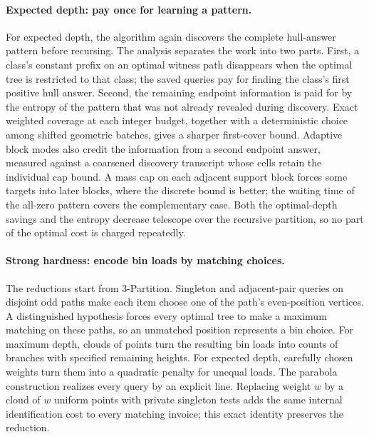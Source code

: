\paragraph{Expected depth: pay once for learning a pattern.}
For expected depth, the algorithm again discovers the complete
hull-answer pattern before recursing. The analysis separates the
work into two parts. First, a class's constant prefix on an optimal
witness path disappears when the optimal tree is restricted to that
class; the saved queries pay for finding the class's first positive
hull answer. Second, the remaining endpoint information is paid for
by the entropy of the pattern that was not already revealed during
discovery. Exact weighted coverage at each integer budget, together
with a deterministic choice among shifted geometric batches, gives a
sharper first-cover bound. Adaptive block modes also credit the information
from a second endpoint answer, measured against a coarsened discovery
transcript whose cells retain the individual cap bound. A mass cap
on each adjacent support block
forces some targets into later blocks, where the discrete bound is
better; the waiting time of the all-zero pattern covers the
complementary case. Both the optimal-depth savings and the entropy
decrease telescope over the recursive partition, so no part of the
optimal cost is charged repeatedly.

\paragraph{Strong hardness: encode bin loads by matching choices.}
The reductions start from 3-Partition. Singleton and adjacent-pair
queries on disjoint odd paths make each item choose one of the
path's even-position vertices. A distinguished hypothesis forces
every optimal tree to make a maximum matching on these paths, so an
unmatched position represents a bin choice. For maximum depth,
clouds of points turn the resulting bin loads into counts of
branches with specified remaining heights. For expected depth,
carefully chosen weights turn them into a quadratic penalty for
unequal loads. The parabola construction realizes every query by an
explicit line. Replacing weight $w$ by a cloud of $w$ uniform points
with private singleton tests adds the same internal identification cost
to every matching invoice; this exact identity preserves the reduction.

